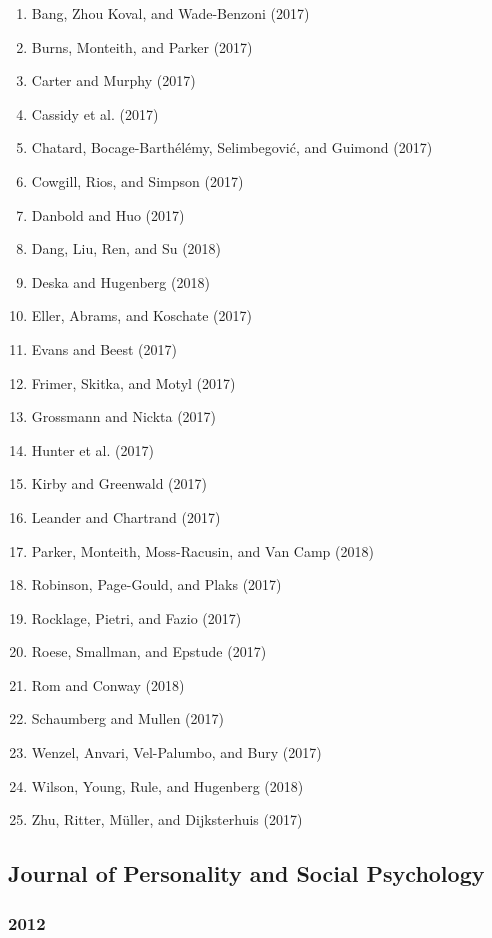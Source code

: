 \documentclass[english,man]{apa6}
\providecommand{\tightlist}{%
  \setlength{\itemsep}{0pt}\setlength{\parskip}{0pt}}
\begin{document}
\begin{enumerate}
\def\labelenumi{\arabic{enumi})}
\tightlist
\item
  Bang, Zhou Koval, and Wade-Benzoni (2017)
\item
  Burns, Monteith, and Parker (2017)
\item
  Carter and Murphy (2017)
\item
  Cassidy et al. (2017)
\item
  Chatard, Bocage-Barthélémy, Selimbegović, and Guimond (2017)
\item
  Cowgill, Rios, and Simpson (2017)
\item
  Danbold and Huo (2017)
\item
  Dang, Liu, Ren, and Su (2018)
\item
  Deska and Hugenberg (2018)
\item
  Eller, Abrams, and Koschate (2017)
\item
  Evans and Beest (2017)
\item
  Frimer, Skitka, and Motyl (2017)
\item
  Grossmann and Nickta (2017)
\item
  Hunter et al. (2017)
\item
  Kirby and Greenwald (2017)
\item
  Leander and Chartrand (2017)
\item
  Parker, Monteith, Moss-Racusin, and Van Camp (2018)
\item
  Robinson, Page-Gould, and Plaks (2017)
\item
  Rocklage, Pietri, and Fazio (2017)
\item
  Roese, Smallman, and Epstude (2017)
\item
  Rom and Conway (2018)
\item
  Schaumberg and Mullen (2017)
\item
  Wenzel, Anvari, Vel-Palumbo, and Bury (2017)
\item
  Wilson, Young, Rule, and Hugenberg (2018)
\item
  Zhu, Ritter, Müller, and Dijksterhuis (2017)
\end{enumerate}

\subsection{Journal of Personality and Social
Psychology}\label{journal-of-personality-and-social-psychology}

\subsubsection{2012}\label{section-48}
\end{document}
